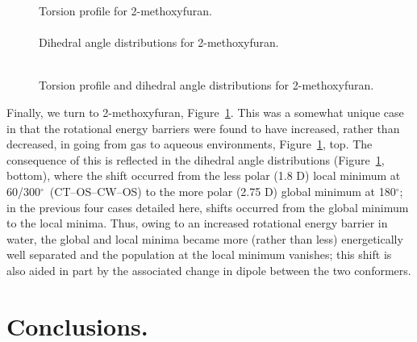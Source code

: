 \documentclass[12pt]{report}
\def\deg{$^{\circ}$}
\def\figlab{Figure}\def\figslab{\figlab s}
\newcommand*\fig[1]{\figlab~\ref{#1}}
\begin{document}
\begin{figure}[htbp]
\centering
Torsion profile for 2-methoxyfuran.\\
\\
Dihedral angle distributions for 2-methoxyfuran.\\
\\
\caption{Torsion profile and dihedral angle distributions for 2-methoxyfuran.}
\label{dihfomegb}
\end{figure}

Finally, we turn to 2-methoxyfuran, \fig{dihfomegb}. This was a somewhat unique case in that the rotational energy barriers were found to have increased, rather than decreased, in going from gas to aqueous environments, \fig{dihfomegb}, top. The consequence of this is reflected in the dihedral angle distributions (\fig{dihfomegb}, bottom), where the shift occurred from the less polar (1.8 D) local minimum at 60/300\deg\ (CT--OS--CW--OS) to the more polar (2.75 D) global minimum at 180\deg; in the previous four cases detailed here, shifts occurred from the global minimum to the local minima. Thus, owing to an increased rotational energy barrier in water, the global and local minima became more (rather than less) energetically well separated and the population at the local minimum vanishes; this shift is also aided in part by the associated change in dipole between the two conformers.




\section{Conclusions.}
\end{document}
